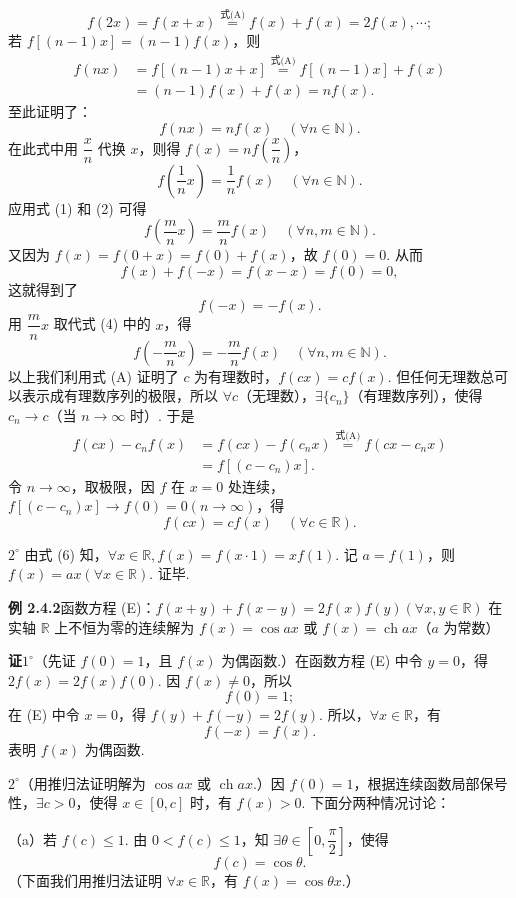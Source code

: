 \documentclass[UTF8, 12pt, fontset=fandol, oneside]{ctexart}
\begin{document}
\[
  f(2x)=f(x+x)\overset{\text{式(A)}}{=}f(x)+f(x)=2f(x),\cdots;
\]
若 $f[(n-1)x]=(n-1)f(x)$，则
\[
\begin{aligned}
f(nx)
&=f[(n-1)x+x]\overset{\text{式(A)}}{=}f[(n-1)x]+f(x)\\
&=(n-1)f(x)+f(x)=nf(x).
\end{aligned}
\]
至此证明了：
\[
  f(nx)=nf(x)\quad(\forall n\in\mathbb{N}). \tag{1}
\]
在此式中用 $\dfrac xn$ 代换 $x$，则得 $f(x)=nf\left(\dfrac xn\right)$，
\[
  f\left(\frac1nx\right)=\frac1nf(x)\quad(\forall n\in\mathbb{N}). \tag{2}
\]
应用式 (1) 和 (2) 可得
\[
  f\left(\frac mnx\right)=\frac mn f(x)\quad(\forall n,m\in\mathbb{N}). \tag{3}
\]
又因为 $f(x)=f(0+x)=f(0)+f(x)$，故 $f(0)=0$. 从而
\[
  f(x)+f(-x)=f(x-x)=f(0)=0,
\]
这就得到了
\[
  f(-x)=-f(x). \tag{4}
\]
用 $\dfrac mnx$ 取代式 (4) 中的 $x$，得
\[
  f\left(-\frac mnx\right)=-\frac mn f(x)\quad(\forall n,m\in\mathbb{N}). \tag{5}
\]
以上我们利用式 (A) 证明了 $c$ 为有理数时，$f(cx)=cf(x)$. 但任何无理数总可以表示成有理数序列的极限，所以 $\forall c$（无理数），$\exists\{c_n\}$（有理数序列），使得 $c_n\to c$（当 $n\to\infty$ 时）. 于是
\[
\begin{aligned}
f(cx)-c_nf(x)
&=f(cx)-f(c_nx)\overset{\text{式(A)}}{=}f(cx-c_nx)\\
&=f[(c-c_n)x].
\end{aligned}
\]
令 $n\to\infty$，取极限，因 $f$ 在 $x=0$ 处连续，$f[(c-c_n)x]\to f(0)=0(n\to\infty)$，得
\[
  f(cx)=cf(x)\quad(\forall c\in\mathbb{R}). \tag{6}
\]

$2^\circ$ 由式 (6) 知，$\forall x\in\mathbb{R},f(x)=f(x\cdot1)=xf(1)$. 记 $a=f(1)$，则 $f(x)=ax(\forall x\in\mathbb{R})$. 证毕.

\noindent\textbf{例 2.4.2}\quad 函数方程 (E)：$f(x+y)+f(x-y)=2f(x)f(y)(\forall x,y\in\mathbb{R})$ 在实轴 $\mathbb{R}$ 上不恒为零的连续解为 $f(x)=\cos ax$ 或 $f(x)=\operatorname{ch} ax$（$a$ 为常数）

\noindent\textbf{证}\quad $1^\circ$（先证 $f(0)=1$，且 $f(x)$ 为偶函数.）在函数方程 (E) 中令 $y=0$，得 $2f(x)=2f(x)f(0)$. 因 $f(x)\ne0$，所以
\[
  f(0)=1; \tag{1}
\]
在 (E) 中令 $x=0$，得 $f(y)+f(-y)=2f(y)$. 所以，$\forall x\in\mathbb{R}$，有
\[
  f(-x)=f(x). \tag{2}
\]
表明 $f(x)$ 为偶函数.

$2^\circ$（用推归法证明解为 $\cos ax$ 或 $\operatorname{ch} ax$.）因 $f(0)=1$，根据连续函数局部保号性，$\exists c>0$，使得 $x\in[0,c]$ 时，有 $f(x)>0$. 下面分两种情况讨论：

（a）若 $f(c)\le1$. 由 $0<f(c)\le1$，知 $\exists\theta\in\left[0,\dfrac\pi2\right]$，使得
\[
  f(c)=\cos\theta. \tag{3}
\]
（下面我们用推归法证明 $\forall x\in\mathbb{R}$，有 $f(x)=\cos\theta x$.）
\end{document}
